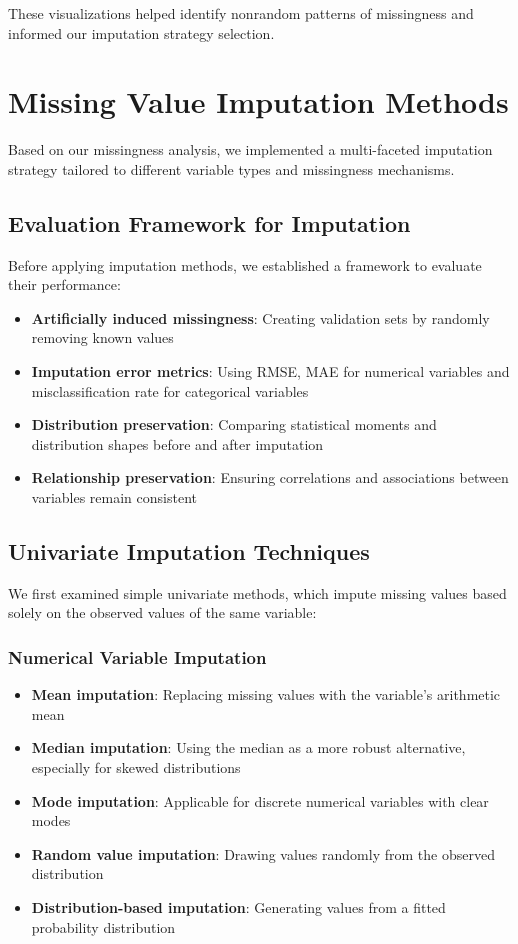 These visualizations helped identify nonrandom patterns of missingness and informed our imputation strategy selection.

\section{Missing Value Imputation Methods}
\label{sec:imputation_methods}

Based on our missingness analysis, we implemented a multi-faceted imputation strategy tailored to different variable types and missingness mechanisms.

\subsection{Evaluation Framework for Imputation}
Before applying imputation methods, we established a framework to evaluate their performance:
\begin{itemize}
    \item \textbf{Artificially induced missingness}: Creating validation sets by randomly removing known values
    \item \textbf{Imputation error metrics}: Using RMSE, MAE for numerical variables and misclassification rate for categorical variables
    \item \textbf{Distribution preservation}: Comparing statistical moments and distribution shapes before and after imputation
    \item \textbf{Relationship preservation}: Ensuring correlations and associations between variables remain consistent
\end{itemize}

\subsection{Univariate Imputation Techniques}
We first examined simple univariate methods, which impute missing values based solely on the observed values of the same variable:

\subsubsection{Numerical Variable Imputation}
\begin{itemize}
    \item \textbf{Mean imputation}: Replacing missing values with the variable's arithmetic mean
    \item \textbf{Median imputation}: Using the median as a more robust alternative, especially for skewed distributions
    \item \textbf{Mode imputation}: Applicable for discrete numerical variables with clear modes
    \item \textbf{Random value imputation}: Drawing values randomly from the observed distribution
    \item \textbf{Distribution-based imputation}: Generating values from a fitted probability distribution
\end{itemize}

